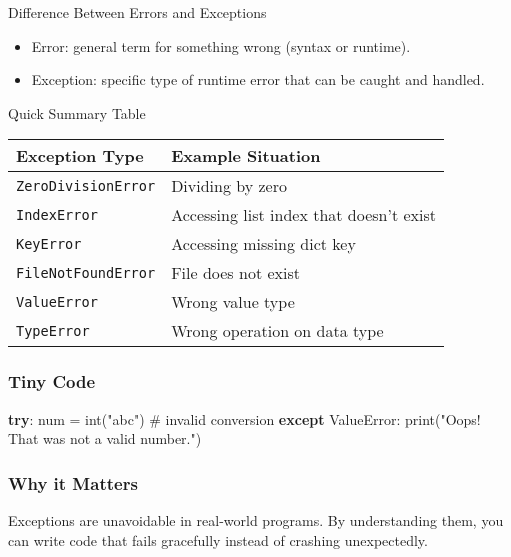 \documentclass[
  letterpaper,
  DIV=11,
  numbers=noendperiod]{scrreprt}
\newenvironment{Shaded}{\begin{snugshade}}{\end{snugshade}}
\newcommand{\BuiltInTok}[1]{\textcolor[rgb]{0.00,0.23,0.31}{#1}}
\newcommand{\CommentTok}[1]{\textcolor[rgb]{0.37,0.37,0.37}{#1}}
\newcommand{\ControlFlowTok}[1]{\textcolor[rgb]{0.00,0.23,0.31}{\textbf{#1}}}
\newcommand{\NormalTok}[1]{\textcolor[rgb]{0.00,0.23,0.31}{#1}}
\newcommand{\OperatorTok}[1]{\textcolor[rgb]{0.37,0.37,0.37}{#1}}
\newcommand{\PreprocessorTok}[1]{\textcolor[rgb]{0.68,0.00,0.00}{#1}}
\newcommand{\StringTok}[1]{\textcolor[rgb]{0.13,0.47,0.30}{#1}}
\providecommand{\tightlist}{%
  \setlength{\itemsep}{0pt}\setlength{\parskip}{0pt}}
\begin{document}
Difference Between Errors and Exceptions

\begin{itemize}
\tightlist
\item
  Error: general term for something wrong (syntax or runtime).
\item
  Exception: specific type of runtime error that can be caught and
  handled.
\end{itemize}

Quick Summary Table

\begin{longtable}[]{@{}ll@{}}
\toprule\noalign{}
Exception Type & Example Situation \\
\midrule\noalign{}
\endhead
\bottomrule\noalign{}
\endlastfoot
\texttt{ZeroDivisionError} & Dividing by zero \\
\texttt{IndexError} & Accessing list index that doesn't exist \\
\texttt{KeyError} & Accessing missing dict key \\
\texttt{FileNotFoundError} & File does not exist \\
\texttt{ValueError} & Wrong value type \\
\texttt{TypeError} & Wrong operation on data type \\
\end{longtable}

\subsubsection{Tiny Code}\label{tiny-code-70}

\begin{Shaded}
\begin{Highlighting}[]
\ControlFlowTok{try}\NormalTok{:}
\NormalTok{    num }\OperatorTok{=} \BuiltInTok{int}\NormalTok{(}\StringTok{"abc"}\NormalTok{)   }\CommentTok{\# invalid conversion}
\ControlFlowTok{except} \PreprocessorTok{ValueError}\NormalTok{:}
    \BuiltInTok{print}\NormalTok{(}\StringTok{"Oops! That was not a valid number."}\NormalTok{)}
\end{Highlighting}
\end{Shaded}

\subsubsection{Why it Matters}\label{why-it-matters-70}

Exceptions are unavoidable in real-world programs. By understanding
them, you can write code that fails gracefully instead of crashing
unexpectedly.
\end{document}
